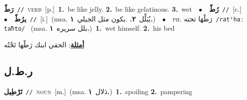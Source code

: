 \documentclass[10pt,a4paper,twoside]{article} %
\begin{document}
\begin{multicols}{2}
{\setlength\topsep{0pt}\textbf{\foreignlanguage{arabic}{رَطّ}}\ {\color{gray}\texttt{//}\color{black}}\ \textsc{verb}\ [p.]\ \textbf{1.}~be like jelly.  \textbf{2.}~be like gelatinous.  \textbf{3.}~wet\ \ $\bullet$\ \ \setlength\topsep{0pt}\textbf{\foreignlanguage{arabic}{رُطّ}}\ {\color{gray}\texttt{//}\color{black}}\ [c.]\ \ $\bullet$\ \ \setlength\topsep{0pt}\textbf{\foreignlanguage{arabic}{يرُطّ}}\ {\color{gray}\texttt{//}\color{black}}\ [i.]\ \color{gray}(msa. \foreignlanguage{arabic}{يُبَلِّل}~\foreignlanguage{arabic}{\textbf{٢.}}  .\foreignlanguage{arabic}{يكون مثل الجيلي}~\foreignlanguage{arabic}{\textbf{١.}})\color{black}\ \ $\bullet$\ \ \textsc{ph.} \color{gray} \foreignlanguage{arabic}{رَطْهَا تحته}\color{black}\ {\color{gray}\texttt{/{\sffamily ratˤhaː taħto}/}\color{black}}\ \color{gray} (msa. \foreignlanguage{arabic}{بلل سريره}~\foreignlanguage{arabic}{\textbf{١.}})\color{black}\ \textbf{1.}~wet himself.  \textbf{2.}~his bed\  \begin{flushright}\color{gray}\foreignlanguage{arabic}{\textbf{\underline{\foreignlanguage{arabic}{أمثلة}}}: الحقي ابنك رَطْها تَحْتُه}\end{flushright}\color{black}} \vspace{2mm}

\vspace{-3mm}
\subsection*{\color{blue}\foreignlanguage{arabic}{ر.ط.ل}\color{blue}{}} 

{\setlength\topsep{0pt}\textbf{\foreignlanguage{arabic}{تَرْطِيل}}\ {\color{gray}\texttt{//}\color{black}}\ \textsc{noun}\ [m.]\ \color{gray}(msa. \foreignlanguage{arabic}{دَلال}~\foreignlanguage{arabic}{\textbf{١.}})\color{black}\ \textbf{1.}~spoiling  \textbf{2.}~pampering\ } \vspace{2mm}


\end{multicols}
\end{document}
